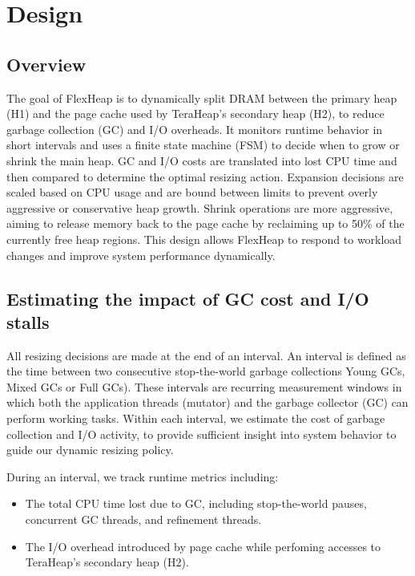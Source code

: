 \section{Design}


\subsection{Overview}

The goal of FlexHeap is to dynamically split DRAM between the primary heap (H1)
and the page cache used by TeraHeap’s secondary heap (H2), to reduce garbage
collection (GC) and I/O overheads. It monitors runtime behavior in short
intervals and uses a finite state machine (FSM) to decide when to grow or
shrink the main heap. GC and I/O costs are translated into lost CPU time and
then compared to determine the optimal resizing action. Expansion decisions are
scaled based on CPU usage and are bound between limits to prevent overly
aggressive or conservative heap growth. Shrink operations are more aggressive,
aiming to release memory back to the page cache by reclaiming up to 50\% of the
currently free heap regions. This design allows FlexHeap to respond to workload
changes and improve system performance dynamically.

\subsection{Estimating the impact of GC cost and I/O stalls}

All resizing decisions are made at the end of an interval. An interval is
defined as the time between two consecutive stop-the-world garbage collections
Young GCs, Mixed GCs or Full GCs). These intervals are recurring measurement windows in which both the
application threads (mutator) and the garbage collector (GC) can perform
working tasks. Within each interval, we estimate the cost of garbage collection and I/O activity,
to provide sufficient insight into system behavior to guide our dynamic resizing policy.

During an interval, we track runtime metrics including:
\begin{itemize}
	\item The total CPU time lost due to GC, including stop-the-world pauses, concurrent GC threads, and refinement threads.
	\item The I/O overhead introduced by page cache while perfoming accesses to TeraHeap's secondary heap (H2).
\end{itemize}
	
